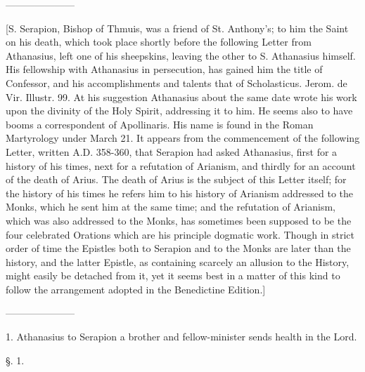 
———————

[S. Serapion, Bishop of Thmuis, was a friend of
St. Anthony’s; to him the Saint on his death, which took place
shortly before the following Letter from Athanasius, left one of his
sheepskins, leaving the other to S. Athanasius himself. His fellowship
with Athanasius in persecution, has gained him the title of Confessor,
and his accomplishments and talents that of Scholasticus. Jerom. de
Vir. Illustr. 99. At his suggestion Athanasius about the same date
wrote his work upon the divinity of the Holy Spirit, addressing it to
him. He seems also to have booms a correspondent of Apollinaris. His
name is found in the Roman Martyrology under March 21. It appears from
the commencement of the following Letter, written A.D. 358-360, that Serapion had asked
Athanasius, first for a history of his times, next for a refutation of
Arianism, and thirdly for an account of the death of Arius. The death
of Arius is the subject of this Letter itself; for the history of his
times he refers him to his history of Arianism addressed to the Monks,
which he sent him at the same time; and the refutation of Arianism,
which was also addressed to the Monks, has sometimes been supposed to
be the four celebrated Orations which are his principle dogmatic work.
Though in strict order of time the Epistles both to Serapion and to
the Monks are later than the history, and the latter Epistle, as
containing scarcely an allusion to the History, might easily be
detached from it, yet it seems best in a matter of this kind to follow
the arrangement adopted in the Benedictine Edition.]

———————

1. Athanasius to Serapion a brother and
fellow-minister sends health in the Lord.

§. 1.


